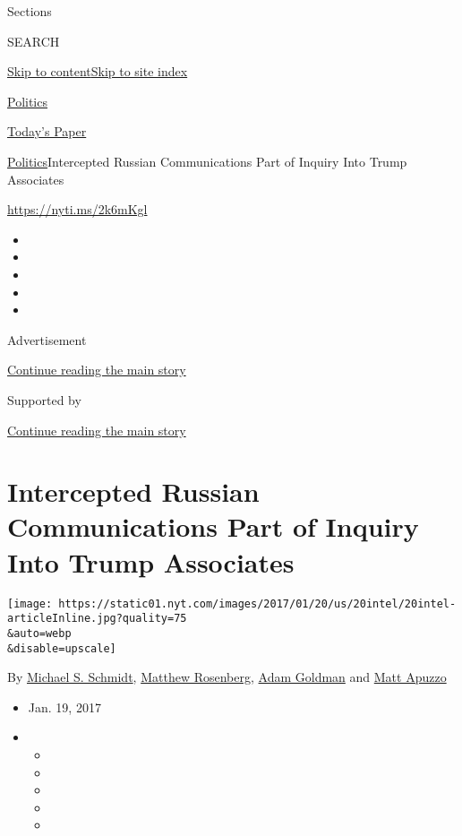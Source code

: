 Sections

SEARCH

\protect\hyperlink{site-content}{Skip to
content}\protect\hyperlink{site-index}{Skip to site index}

\href{https://www.nytimes.com/section/politics}{Politics}

\href{https://myaccount.nytimes.com/auth/login?response_type=cookie\&client_id=vi}{}

\href{https://www.nytimes.com/section/todayspaper}{Today's Paper}

\href{/section/politics}{Politics}\textbar{}Intercepted Russian
Communications Part of Inquiry Into Trump Associates

\url{https://nyti.ms/2k6mKgl}

\begin{itemize}
\item
\item
\item
\item
\item
\end{itemize}

Advertisement

\protect\hyperlink{after-top}{Continue reading the main story}

Supported by

\protect\hyperlink{after-sponsor}{Continue reading the main story}

\hypertarget{intercepted-russian-communications-part-of-inquiry-into-trump-associates}{%
\section{Intercepted Russian Communications Part of Inquiry Into Trump
Associates}\label{intercepted-russian-communications-part-of-inquiry-into-trump-associates}}

\texttt{[image: https://static01.nyt.com/images/2017/01/20/us/20intel/20intel-articleInline.jpg?quality=75\\\&auto=webp\\\&disable=upscale]}

By \href{http://www.nytimes.com/by/michael-s-schmidt}{Michael S.
Schmidt}, \href{http://www.nytimes.com/by/matthew-rosenberg}{Matthew
Rosenberg}, \href{https://www.nytimes.com/by/adam-goldman}{Adam Goldman}
and \href{http://www.nytimes.com/by/matt-apuzzo}{Matt Apuzzo}

\begin{itemize}
\item
  Jan. 19, 2017
\item
  \begin{itemize}
  \item
  \item
  \item
  \item
  \item
  \end{itemize}
\end{itemize}

